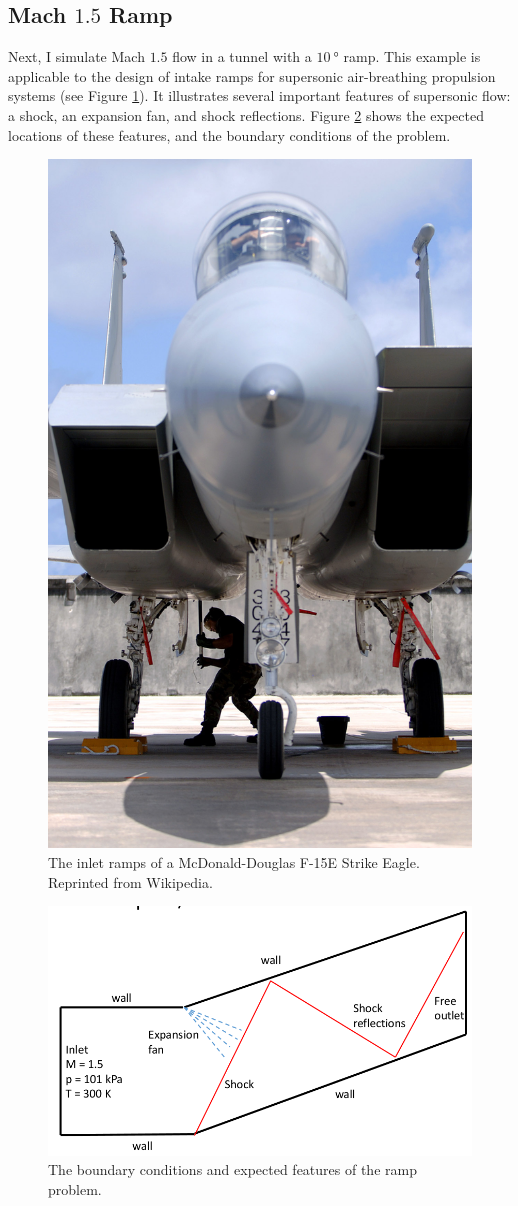 \documentclass[paper=a4, fontsize=11pt]{scrartcl}
\numberwithin{equation}{section}        %
\numberwithin{figure}{section}          %
\numberwithin{table}{section}               %
\begin{document}
\subsection{Mach $1.5$ Ramp}
Next, I simulate Mach $1.5$ flow in a tunnel with a $\SI{10}{\degree}$ ramp. This example is applicable to the design of intake ramps for supersonic air-breathing propulsion systems (see Figure \ref{fig:F-15_ramp}). It illustrates several important features of supersonic flow: a shock, an expansion fan, and shock reflections. Figure \ref{fig:mach_ramp} shows the expected locations of these features, and the boundary conditions of the problem. 

\begin{figure}[H]
    \centering
    \includegraphics[width = 0.4 \textwidth]{figures/F-15_ramp.jpg}
    \caption{The inlet ramps of a McDonald-Douglas F-15E Strike Eagle. Reprinted from Wikipedia.}
    \label{fig:F-15_ramp}
\end{figure}

\begin{figure}[H]
    \centering
    \includegraphics[width = 0.8 \textwidth]{figures/mach_ramp.png}
    \caption{The boundary conditions and expected features of the ramp problem.}
    \label{fig:mach_ramp}
\end{figure}
\end{document}

